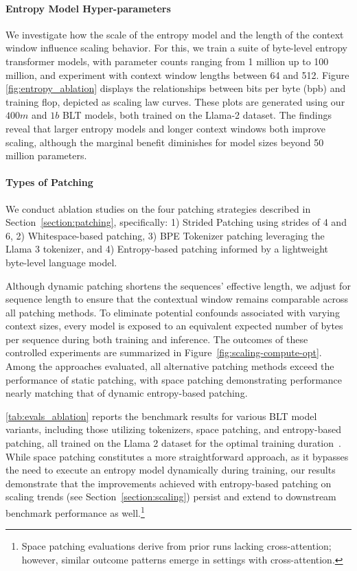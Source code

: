 \paragraph{Entropy Model Hyper-parameters} We investigate how the scale of the entropy model and the length of the context window influence scaling behavior. For this, we train a suite of byte-level entropy transformer models, with parameter counts ranging from 1 million up to 100 million, and experiment with context window lengths between 64 and 512. Figure \autoref{fig:entropy_ablation} displays the relationships between bits per byte (bpb) and training flop, depicted as scaling law curves. These plots are generated using our $400m$ and $1b$ {\textsc BLT} models, both trained on the Llama-2 dataset. The findings reveal that larger entropy models and longer context windows both improve scaling, although the marginal benefit diminishes for model sizes beyond 50 million parameters.

\paragraph{Types of Patching}

We conduct ablation studies on the four patching strategies described in Section~\ref{section:patching}, specifically: 1) Strided Patching using strides of 4 and 6, 2) Whitespace-based patching, 3) BPE Tokenizer patching leveraging the Llama 3 tokenizer, and 4) Entropy-based patching informed by a lightweight byte-level language model.

Although dynamic patching shortens the sequences' effective length, we adjust for sequence length to ensure that the contextual window remains comparable across all patching methods. To eliminate potential confounds associated with varying context sizes, every model is exposed to an equivalent expected number of bytes per sequence during both training and inference. The outcomes of these controlled experiments are summarized in Figure~\ref{fig:scaling-compute-opt}. Among the approaches evaluated, all alternative patching methods exceed the performance of static patching, with space patching demonstrating performance nearly matching that of dynamic entropy-based patching.

\autoref{tab:evals_ablation} reports the benchmark results for various {\textsc BLT} model variants, including those utilizing tokenizers, space patching, and entropy-based patching, all trained on the Llama 2 dataset for the optimal training duration~\citep{dubey2024llama}. While space patching constitutes a more straightforward approach, as it bypasses the need to execute an entropy model dynamically during training, our results demonstrate that the improvements achieved with entropy-based patching on scaling trends (see Section~\ref{section:scaling}) persist and extend to downstream benchmark performance as well.\footnote{Space patching evaluations derive from prior runs lacking cross-attention; however, similar outcome patterns emerge in settings with cross-attention.}

